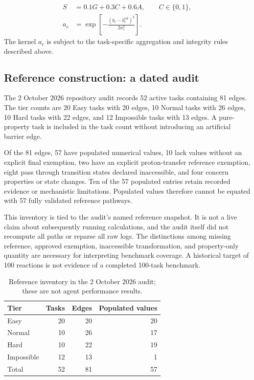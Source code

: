 \documentclass[11pt,a4paper]{article}
\begin{document}
\begin{align}
S &= 0.1G + 0.3C + 0.6A, \qquad C\in\{0,1\},\\
a_e &= \exp\!\left[-\frac{(b_e-b_e^{\mathrm{ref}})^2}{2\sigma_e^2}\right].
\end{align}
The kernel $a_e$ is subject to the task-specific aggregation and integrity rules described above.

\subsection{Reference construction: a dated audit}
The 2 October 2026 repository audit records 52 active tasks containing 81 edges. The tier counts are 20 Easy tasks with 20 edges, 10 Normal tasks with 26 edges, 10 Hard tasks with 22 edges, and 12 Impossible tasks with 13 edges. A pure-property task is included in the task count without introducing an artificial barrier edge.

Of the 81 edges, 57 have populated numerical values, 10 lack values without an explicit final exemption, two have an explicit proton-transfer reference exemption, eight pass through transition states declared inaccessible, and four concern properties or state changes. Ten of the 57 populated entries retain recorded evidence or mechanistic limitations. Populated values therefore cannot be equated with 57 fully validated reference pathways.

This inventory is tied to the audit's named reference snapshot. It is not a live claim about subsequently running calculations, and the audit itself did not recompute all paths or reparse all raw logs. The distinctions among missing reference, approved exemption, inaccessible transformation, and property-only quantity are necessary for interpreting benchmark coverage. A historical target of 100 reactions is not evidence of a completed 100-task benchmark.

\begin{table}[htbp]
\centering
\caption{Reference inventory in the 2 October 2026 audit; these are not agent performance results.}
\begin{tabular}{lrrr}
\toprule
Tier & Tasks & Edges & Populated values\\
\midrule
Easy & 20 & 20 & 20\\
Normal & 10 & 26 & 17\\
Hard & 10 & 22 & 19\\
Impossible & 12 & 13 & 1\\
\midrule
Total & 52 & 81 & 57\\
\bottomrule
\end{tabular}
\end{table}
\end{document}
